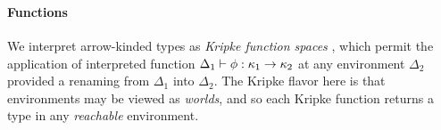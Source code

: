 \documentclass[sigplan,screen]{acmart}
\begin{document}
\begin{AgdaAlign}
\begin{code}[hide]%
%
\>[2]\AgdaSpace{}%
\AgdaModule{\AgdaUnderscore{}}\AgdaSpace{}%
\AgdaSpace{}%
\<%
\end{code}
\begin{code}%
\>[2][@{}l@{\AgdaIndent{1}}]%
\>[4]\AgdaSpace{}%
\AgdaSymbol{:}\AgdaSpace{}%
\AgdaSpace{}%
\AgdaSpace{}%
\AgdaSpace{}%
\AgdaSpace{}%
\<%
\\
%
\>[4]\AgdaSpace{}%
\AgdaSpace{}%
\AgdaSpace{}%
\AgdaSymbol{=}\AgdaSpace{}%
\AgdaSpace{}%
\AgdaSpace{}%
\<%
\\
%
\>[4]\AgdaSpace{}%
\AgdaSpace{}%
\AgdaSpace{}%
\AgdaSymbol{=}\AgdaSpace{}%
\AgdaSpace{}%
\AgdaSpace{}%
\<%
\end{code}
\begin{code}[hide]%
%
\>[4]\AgdaSpace{}%
\AgdaSpace{}%
\AgdaSymbol{\AgdaUnderscore{}}\AgdaSpace{}%
\AgdaSymbol{=}\AgdaSpace{}%
\<%
\end{code}
\end{AgdaAlign}

\paragraph{Functions} We interpret arrow-kinded types as \emph{Kripke function spaces} \citep{JungT93, Abel13}, which permit the application of interpreted function $\Delta_1 \vdash \phi : \kappa_1 \to \kappa_2$ at any environment $\Delta_2$ provided a renaming from $\Delta_1$ into $\Delta_2$. The Kripke flavor here is that environments may be viewed as \emph{worlds}, and so each Kripke function returns a type in any \emph{reachable} environment.
\end{document}
